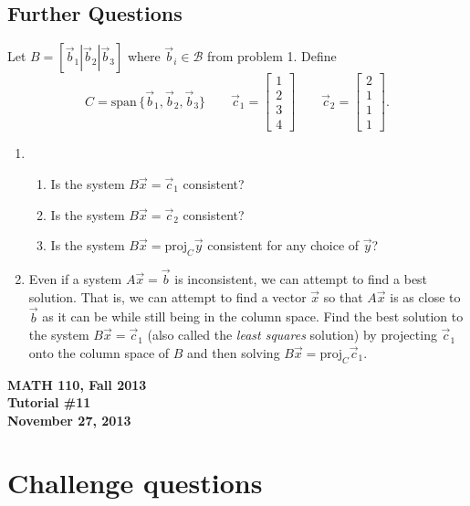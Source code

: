 \documentclass[11pt]{exam}
\newcommand{\proj}{\mathrm{proj}}
\newcommand{\mat}[1]{\begin{bmatrix}#1\end{bmatrix}}
\renewcommand{\span}{\mathrm{span}\,}
\newcommand{\mthCourse}{MATH 110}
\newcommand{\mthTerm}{Fall 2013}
\newcommand{\mthTutorialNumber}{11}
\newcommand{\mthDate}{November 27, 2013}
\begin{document}
\subsection*{Further Questions}
	Let $B=[\vec b_1|\vec b_2|\vec b_3]$ where $\vec b_i\in\mathcal B$ from problem 1.
	Define 
	\[
		C=\span\{\vec b_1,\vec b_2,\vec b_3\}\qquad
		\vec c_1=\mat{1\\2\\3\\4}\qquad
		\vec c_2=\mat{2\\1\\1\\1}.
	\]
\begin{enumerate}[resume]
	
	\item 
	\begin{enumerate}
		\item Is the system $B\vec x=\vec c_1$ consistent?
		\item Is the system $B\vec x=\vec c_2$ consistent?
		\item Is the system $B\vec x=\proj_C\vec y$ consistent for any choice of $\vec y$?
	\end{enumerate}
	\item Even if a system $A\vec x=\vec b$ is inconsistent, we can attempt to find
		a best solution.  That is, we can attempt to find a vector $\vec x$ so
		that $A\vec x$ is as close to $\vec b$ as it can be while still
		being in the column space.  Find the best solution to the
		system $B\vec x=\vec c_1$ (also called the \emph{least squares}
		solution) by projecting $\vec c_1$ onto the column space of $B$ and then
		solving $B\vec x=\proj_C\vec c_1$.
\end{enumerate}




\newpage
{
	\begin{center}
		{\bf \mthCourse, \mthTerm}\\ 
		{\bf Tutorial \#\mthTutorialNumber}\\
		{\bf \mthDate}
	\end{center}
}

\section*{Challenge questions}
\end{document}
